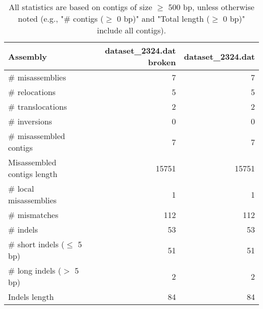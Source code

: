 \documentclass[12pt,a4paper]{article}
\begin{document}
\begin{table}[ht]
\begin{center}
\caption{All statistics are based on contigs of size $\geq$ 500 bp, unless otherwise noted (e.g., "\# contigs ($\geq$ 0 bp)" and "Total length ($\geq$ 0 bp)" include all contigs).}
\begin{tabular}{|l*{2}{|r}|}
\hline
Assembly & dataset\_2324.dat broken & dataset\_2324.dat \\ \hline
\# misassemblies & 7 & 7 \\ \hline
\hspace{5mm}\# relocations & 5 & 5 \\ \hline
\hspace{5mm}\# translocations & 2 & 2 \\ \hline
\hspace{5mm}\# inversions & 0 & 0 \\ \hline
\# misassembled contigs & 7 & 7 \\ \hline
Misassembled contigs length & 15751 & 15751 \\ \hline
\# local misassemblies & 1 & 1 \\ \hline
\# mismatches & 112 & 112 \\ \hline
\# indels & 53 & 53 \\ \hline
\hspace{5mm}\# short indels ($\leq$ 5 bp) & 51 & 51 \\ \hline
\hspace{5mm}\# long indels ($>$ 5 bp) & 2 & 2 \\ \hline
Indels length & 84 & 84 \\ \hline
\end{tabular}
\end{center}
\end{table}
\end{document}
